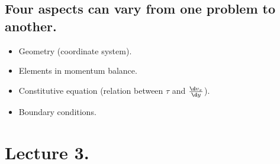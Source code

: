 \subsection{Four aspects can vary from one problem to another.}
\begin{itemize}
	\item Geometry (coordinate system).
	\item Elements in momentum balance.
	\item Constitutive equation (relation between $\tau$ and $\frac{\d v_x}{\d y}$).
	\item Boundary conditions.
\end{itemize}

\section{Lecture 3.}
